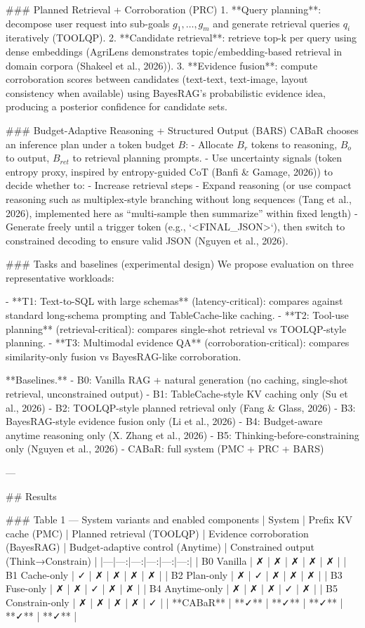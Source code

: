 ### Planned Retrieval + Corroboration (PRC)  
1. **Query planning**: decompose user request into sub-goals \(g_1,\dots,g_m\) and generate retrieval queries \(q_i\) iteratively (TOOLQP).  
2. **Candidate retrieval**: retrieve top-k per query using dense embeddings (AgriLens demonstrates topic/embedding-based retrieval in domain corpora (Shakeel et al., 2026)).  
3. **Evidence fusion**: compute corroboration scores between candidates (text-text, text-image, layout consistency when available) using BayesRAG’s probabilistic evidence idea, producing a posterior confidence for candidate sets.

### Budget-Adaptive Reasoning + Structured Output (BARS)  
CABaR chooses an inference plan under a token budget \(B\):
- Allocate \(B_r\) tokens to reasoning, \(B_o\) to output, \(B_{ret}\) to retrieval planning prompts.
- Use uncertainty signals (token entropy proxy, inspired by entropy-guided CoT (Banfi & Gamage, 2026)) to decide whether to:
  - Increase retrieval steps
  - Expand reasoning (or use compact reasoning such as multiplex-style branching without long sequences (Tang et al., 2026), implemented here as “multi-sample then summarize” within fixed length)
- Generate freely until a trigger token (e.g., `<FINAL_JSON>`), then switch to constrained decoding to ensure valid JSON (Nguyen et al., 2026).

### Tasks and baselines (experimental design)  
We propose evaluation on three representative workloads:

- **T1: Text-to-SQL with large schemas** (latency-critical): compares against standard long-schema prompting and TableCache-like caching.  
- **T2: Tool-use planning** (retrieval-critical): compares single-shot retrieval vs TOOLQP-style planning.  
- **T3: Multimodal evidence QA** (corroboration-critical): compares similarity-only fusion vs BayesRAG-like corroboration.

**Baselines.**
- B0: Vanilla RAG + natural generation (no caching, single-shot retrieval, unconstrained output)
- B1: TableCache-style KV caching only (Su et al., 2026)
- B2: TOOLQP-style planned retrieval only (Fang & Glass, 2026)
- B3: BayesRAG-style evidence fusion only (Li et al., 2026)
- B4: Budget-aware anytime reasoning only (X. Zhang et al., 2026)
- B5: Thinking-before-constraining only (Nguyen et al., 2026)
- CABaR: full system (PMC + PRC + BARS)

---

## Results  

### Table 1 — System variants and enabled components  
| System | Prefix KV cache (PMC) | Planned retrieval (TOOLQP) | Evidence corroboration (BayesRAG) | Budget-adaptive control (Anytime) | Constrained output (Think→Constrain) |
|---|---:|---:|---:|---:|---:|
| B0 Vanilla | ✗ | ✗ | ✗ | ✗ | ✗ |
| B1 Cache-only | ✓ | ✗ | ✗ | ✗ | ✗ |
| B2 Plan-only | ✗ | ✓ | ✗ | ✗ | ✗ |
| B3 Fuse-only | ✗ | ✗ | ✓ | ✗ | ✗ |
| B4 Anytime-only | ✗ | ✗ | ✗ | ✓ | ✗ |
| B5 Constrain-only | ✗ | ✗ | ✗ | ✗ | ✓ |
| **CABaR** | **✓** | **✓** | **✓** | **✓** | **✓** |

